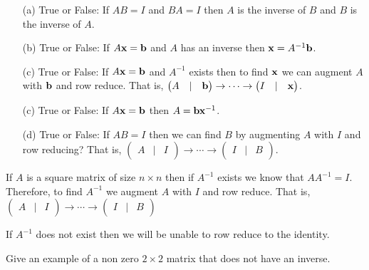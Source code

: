\begin{problem}
    \begin{enumerate}
        \item[(a)] True or False: If $AB = I$ and $BA = I$ then $A$ is the inverse of $B$
            and $B$ is the inverse of $A$. 
        \item[(b)] True or False: If $A{\bf x} = {\bf b}$ and $A$ has an inverse then ${\bf x} =
            A^{-1} {\bf b}$.
        \item[(c)] True or False: If $A {\bf x} = {\bf b}$ and $A^{-1}$ exists then to find ${\bf x}$ we can augment $A$
            with ${\bf b}$ and row reduce.  That is, $\begin{pmatrix} A & | & {\bf b}
            \end{pmatrix} \to \cdots \to \begin{pmatrix} I & | & {\bf x}
            \end{pmatrix}$.
        \item[(c)] True or False: If $A {\bf x} = {\bf b}$ then $A = {\bf b} {\bf x}^{-1}$.
        \item[(d)] True or False: If $AB = I$ then we can find $B$ by augmenting $A$ with $I$ and row
            reducing?  That is, $\begin{pmatrix} A & | & I \end{pmatrix} \to \cdots \to
            \begin{pmatrix} I & | & B \end{pmatrix}$. 
    \end{enumerate}
\end{problem}

\begin{technique}
    If $A$ is a square matrix of size $n \times n$ then if $A^{-1}$ exists we know that
    $AA^{-1} = I$.  Therefore, to find $A^{-1}$ we augment $A$ with $I$ and row reduce.
    That is, $\begin{pmatrix} A & | & I \end{pmatrix} \to \cdots \to \begin{pmatrix} I & |
        & B \end{pmatrix}$

    If $A^{-1}$ does not exist then we will be unable to row reduce to the identity.
\end{technique}

\begin{problem}
    Give an example of a non zero $2 \times 2$ matrix that does not have an inverse.
\end{problem}
\solution{
    \[ A = \begin{pmatrix} 1 & 0 \\ 0 & 0 \end{pmatrix} \]
}

